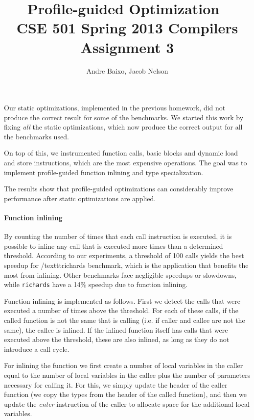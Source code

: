 \documentclass[10pt,twocolumn]{article}
\begin{document}
\title{Profile-guided Optimization\ \\
  \small CSE 501 Spring 2013 Compilers Assignment 3}
\author{Andre Baixo, Jacob Nelson}
\maketitle


Our static optimizations, implemented in the previous homework, did not
produce the correct result for some of the benchmarks. We started this
work by fixing \emph{all} the static optimizations, which now produce
the correct output for all the benchmarks used.

On top of this, we instrumented function calls, basic blocks and
dynamic load and store instructions, which are the most expensive
operations. The goal was to implement profile-guided function inlining and type specialization.

The results show that profile-guided optimizations can considerably improve performance
after static optimizations are applied.

\paragraph{Function inlining}
By counting the number of times that each call instruction is executed, it is possible to inline any call that is executed more times than a determined threshold. According to our experiments, a threshold of 100 calls yields the best speedup for /texttt{richards} benchmark, which is the application that benefits the most from inlining. Other benchmarks face negligible speedups or slowdowns, while \texttt{richards} have a 14\% speedup due to function inlining.

Function inlining is implemented as follows. First we detect the calls that were executed a number of times above the threshold. For each of these calls, if the called function is not the same that is calling (i.e. if caller and callee are not the same), the callee is inlined. If the inlined function itself has calls that were executed above the threshold, these are also inlined, as long as they do not introduce a call cycle.

For inlining the function we first create a number of local variables in the caller equal to the number of local variables in the callee plus the number of parameters necessary for calling it. For this, we simply update the header of the caller function (we copy the types from the header of the called function), and then we update the \emph{enter} instruction of the caller to allocate space for the additional local variables.
\end{document}
